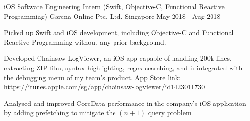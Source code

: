 

\begin{cventries}


	\cventry
		{iOS Software Engineering Intern (Swift, Objective-C, Functional Reactive Programming)} %
		{Garena Online Pte. Ltd.} %
		{Singapore} %
		{May 2018 - Aug 2018} %
		{
			\begin{cvitems}
				\item {Picked up Swift and iOS development, including Objective-C and Functional Reactive Programming without any prior background.}
				\item {Developed Chainsaw LogViewer, an iOS app capable of handling 200k lines, extracting ZIP files, syntax highlighting, regex searching, and is integrated with the debugging menu of my team's product. App Store link: \url{https://itunes.apple.com/sg/app/chainsaw-logviewer/id1423011730}}
				\item {Analysed and improved CoreData performance in the company's iOS application by adding prefetching to mitigate the $(n+1)$ query problem.}
			\end{cvitems}
		}


\end{cventries}
